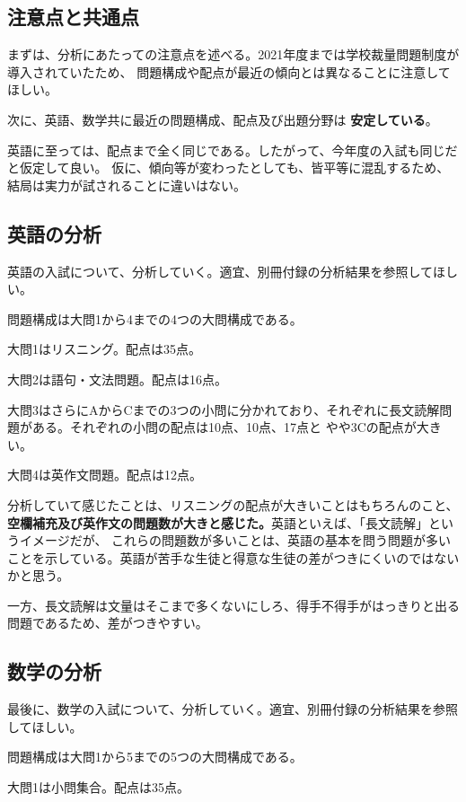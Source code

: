 \subsection{\textbf{注意点と共通点}}
まずは、分析にあたっての注意点を述べる。2021年度までは学校裁量問題制度が導入されていたため、
問題構成や配点が最近の傾向とは異なることに注意してほしい。

次に、英語、数学共に最近の問題構成、配点及び出題分野は \textbf{安定している}。

英語に至っては、配点まで全く同じである。したがって、今年度の入試も同じだと仮定して良い。
仮に、傾向等が変わったとしても、皆平等に混乱するため、結局は実力が試されることに違いはない。

\subsection{\textbf{英語の分析}}
英語の入試について、分析していく。適宜、別冊付録の分析結果を参照してほしい。

問題構成は大問1から4までの4つの大問構成である。

大問1はリスニング。配点は35点。

大問2は語句・文法問題。配点は16点。

大問3はさらにAからCまでの3つの小問に分かれており、それぞれに長文読解問題がある。それぞれの小問の配点は10点、10点、17点と
やや3Cの配点が大きい。

大問4は英作文問題。配点は12点。
\vspace{1em}

分析していて感じたことは、リスニングの配点が大きいことはもちろんのこと、
\textbf{空欄補充及び英作文の問題数が大きと感じた。}英語といえば、「長文読解」というイメージだが、
これらの問題数が多いことは、英語の基本を問う問題が多いことを示している。英語が苦手な生徒と得意な生徒の差がつきにくいのではないかと思う。

一方、長文読解は文量はそこまで多くないにしろ、得手不得手がはっきりと出る問題であるため、差がつきやすい。

\newpage

\subsection{\textbf{数学の分析}}
最後に、数学の入試について、分析していく。適宜、別冊付録の分析結果を参照してほしい。

問題構成は大問1から5までの5つの大問構成である。

大問1は小問集合。配点は35点。


